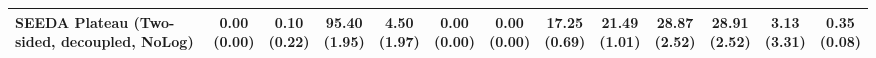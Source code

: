 \begin{table}[H]
{\begin{tabular}{l|cccccc|cccccc}
SEEDA Plateau (Two-sided, decoupled, NoLog) & \makecell{0.00 \\ (0.00)} & \makecell{0.10 \\ (0.22)} & {\cellcolor[HTML]{C8E6C9}} \bfseries \makecell{95.40 \\ (1.95)} & \makecell{4.50 \\ (1.97)} & \makecell{0.00 \\ (0.00)} & \makecell{0.00 \\ (0.00)} & \makecell{17.25 \\ (0.69)} & \makecell{21.49 \\ (1.01)} & {\cellcolor[HTML]{C8E6C9}} \makecell{28.87 \\ (2.52)} & \bfseries \makecell{28.91 \\ (2.52)} & \makecell{3.13 \\ (3.31)} & \makecell{0.35 \\ (0.08)} \\
\bottomrule
\end{tabular}
}%
\end{table}

